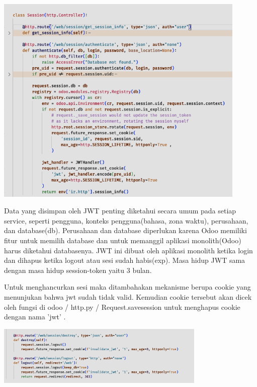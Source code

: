 \begin{center}
	\includegraphics[width=12cm]{img/bab_4/sessionRoute.png}
	\label{fig:sessionRoute}
\end{center}

Data yang disimpan oleh JWT penting diketahui secara umum pada setiap service, seperti pengguna, konteks pengguna(bahasa, zona waktu), perusahaan, dan database(db).  Perusahaan dan database diperlukan karena Odoo memiliki fitur untuk memilih database dan untuk memanggil  aplikasi monolith(Odoo) harus diketahui databasenya. JWT ini dibuat oleh aplikasi monolith ketika login dan dihapus ketika logout atau sesi sudah habis(exp). Masa hidup JWT sama dengan masa hidup session-token yaitu 3 bulan.

Untuk menghancurkan sesi maka ditambahakan mekanisme berupa cookie yang menunjukan bahwa jwt sudah tidak valid. Kemudian cookie tersebut akan dicek oleh fungsi di odoo / http.py / Request.savesession untuk menghapus cookie dengan nama 'jwt' . 

\begin{center}
	\includegraphics[width=10cm]{img/bab_4/triggerCookieDel.png}
	\label{fig:triggerCookieDel}
\end{center}


